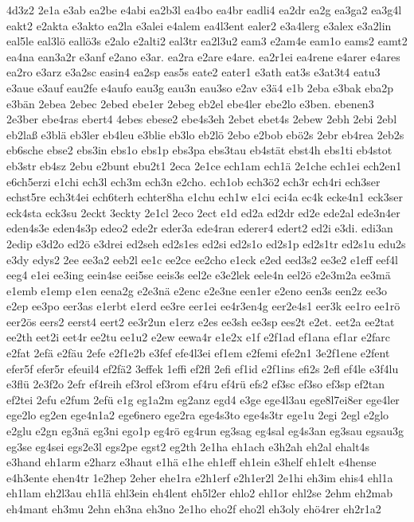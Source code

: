 {4d3z2
2e1a
e3ab
ea2be
e4abi
ea2b3l
ea4bo
ea4br
eadli4
ea2dr
ea2g
ea3ga2
ea3g4l
eakt2
e2akta
e3akto
ea2la
e3alei
e4alem
ea4l3ent
ealer2
e3a4lerg
e3alex
e3a2lin
eal5le
eal3lö
eallö3s
e2alo
e2alti2
eal3tr
ea2l3u2
eam3
e2am4e
eam1o
eams2
eamt2
ea4na
ean3a2r
e3anf
e2ano
e3ar.
ea2ra
e2are
e4are.
ea2r1ei
ea4rene
e4arer
e4ares
ea2ro
e3arz
e3a2sc
easin4
ea2sp
eas5s
eate2
eater1
e3ath
eat3s
e3at3t4
eatu3
e3aue
e3auf
eau2fe
e4aufo
eau3g
eau3n
eau3so
e2av
e3ä4
e1b
2eba
e3bak
eba2p
e3bän
2ebea
2ebec
2ebed
ebe1er
2ebeg
eb2el
ebe4ler
ebe2lo
e3ben.
ebenen3
2e3ber
ebe4ras
ebert4
4ebes
ebese2
ebe4s3eh
2ebet
ebet4s
2ebew
2ebh
2ebi
2ebl
eb2laß
e3blä
eb3ler
eb4leu
e3blie
eb3lo
eb2lö
2ebo
e2bob
ebö2s
2ebr
eb4rea
2eb2s
eb6sche
ebse2
ebs3in
ebs1o
ebs1p
ebs3pa
ebs3tau
eb4stät
ebst4h
ebs1ti
eb4stot
eb3str
eb4sz
2ebu
e2bunt
ebu2t1
2eca
2e1ce
ech1am
ech1ä
2e1che
ech1ei
ech2en1
e6ch5erzi
e1chi
ech3l
ech3m
ech3n
e2cho.
ech1ob
ech3ö2
ech3r
ech4ri
ech3ser
echst5re
ech3t4ei
ech6terh
echter8ha
e1chu
ech1w
e1ci
eci4a
ec4k
ecke4n1
eck3ser
eck4sta
eck3su
2eckt
3eckty
2e1cl
2eco
2ect
e1d
ed2a
ed2dr
ed2e
ede2al
ede3n4er
eden4s3e
eden4s3p
edeo2
ede2r
eder3a
ede4ran
ederer4
edert2
ed2i
e3di.
edi3an
2edip
e3d2o
ed2ö
e3drei
ed2seh
ed2s1es
ed2si
ed2s1o
ed2s1p
ed2s1tr
ed2s1u
edu2s
e3dy
edys2
2ee
ee3a2
eeb2l
ee1c
ee2ce
ee2cho
e1eck
e2ed
eed3s2
ee3e2
e1eff
eef4l
eeg4
e1ei
ee3ing
eein4se
eei5se
eeis3s
eel2e
e3e2lek
eele4n
eel2ö
e2e3m2a
ee3mä
e1emb
e1emp
e1en
eena2g
e2e3nä
e2enc
e2e3ne
een1er
e2eno
een3s
een2z
ee3o
e2ep
ee3po
eer3as
e1erbt
e1erd
ee3re
eer1ei
ee4r3en4g
eer2e4s1
eer3k
ee1ro
ee1rö
eer2ös
eers2
eerst4
eert2
ee3r2un
e1erz
e2es
ee3sh
ee3sp
ees2t
e2et.
eet2a
ee2tat
ee2th
eet2i
eet4r
ee2tu
ee1u2
e2ew
eewa4r
e1e2x
e1f
e2f1ad
ef1ana
ef1ar
e2farc
e2fat
2efä
e2fäu
2efe
e2f1e2b
e3fef
efe4l3ei
ef1em
e2femi
efe2n1
3e2f1ene
e2fent
efer5f
efer5r
efeuil4
ef2fä2
3effek
1effi
ef2fl
2efi
ef1id
e2f1ins
efi2s
2efl
ef4le
e3f4lu
e3flü
2e3f2o
2efr
ef4reih
ef3rol
ef3rom
ef4ru
ef4rü
efs2
ef3sc
ef3so
ef3sp
ef2tan
ef2tei
2efu
e2fum
2efü
e1g
eg1a2m
eg2anz
egd4
e3ge
ege4l3au
ege8l7ei8er
ege4ler
ege2lo
eg2en
ege4n1a2
ege6nero
ege2ra
ege4s3to
ege4s3tr
ege1u
2egi
2egl
e2glo
e2glu
e2gn
eg3nä
eg3ni
ego1p
eg4rö
eg4run
eg3sag
eg4sal
eg4s3an
eg3sau
egsau3g
eg3se
eg4sei
egs2e3l
egs2pe
egst2
eg2th
2e1ha
eh1ach
e3h2ah
eh2al
ehalt4s
e3hand
eh1arm
e2harz
e3haut
e1hä
e1he
eh1eff
eh1ein
e3helf
eh1elt
e4hense
e4h3ente
ehen4tr
1e2hep
2eher
ehe1ra
e2h1erf
e2h1er2l
2e1hi
eh3im
ehis4
ehl1a
eh1lam
eh2l3au
eh1lä
ehl3ein
eh4lent
eh5l2er
ehlo2
ehl1or
ehl2se
2ehm
eh2mab
eh4mant
eh3mu
2ehn
eh3na
eh3no
2e1ho
eho2f
eho2l
eh3oly
ehö4rer
eh2r1a2
}
